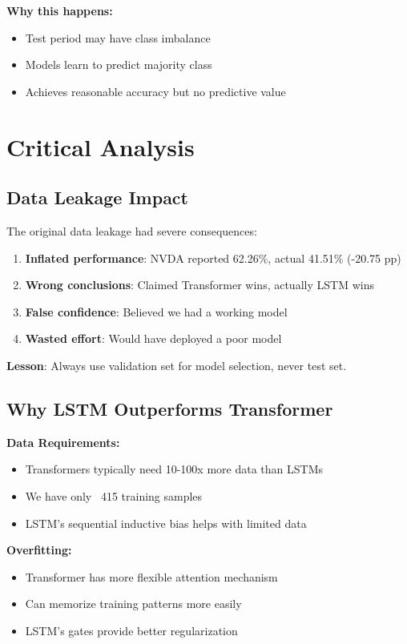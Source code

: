 \documentclass[10pt,twocolumn]{article}
\begin{document}
\textbf{Why this happens:}
\begin{itemize}
\item Test period may have class imbalance
\item Models learn to predict majority class
\item Achieves reasonable accuracy but no predictive value
\end{itemize}

\section{Critical Analysis}

\subsection{Data Leakage Impact}

The original data leakage had severe consequences:

\begin{enumerate}
\item \textbf{Inflated performance}: NVDA reported 62.26\%, actual 41.51\% (-20.75 pp)
\item \textbf{Wrong conclusions}: Claimed Transformer wins, actually LSTM wins
\item \textbf{False confidence}: Believed we had a working model
\item \textbf{Wasted effort}: Would have deployed a poor model
\end{enumerate}

\textbf{Lesson}: Always use validation set for model selection, never test set.

\subsection{Why LSTM Outperforms Transformer}

\textbf{Data Requirements:}
\begin{itemize}
\item Transformers typically need 10-100x more data than LSTMs
\item We have only ~415 training samples
\item LSTM's sequential inductive bias helps with limited data
\end{itemize}

\textbf{Overfitting:}
\begin{itemize}
\item Transformer has more flexible attention mechanism
\item Can memorize training patterns more easily
\item LSTM's gates provide better regularization
\end{itemize}
\end{document}
